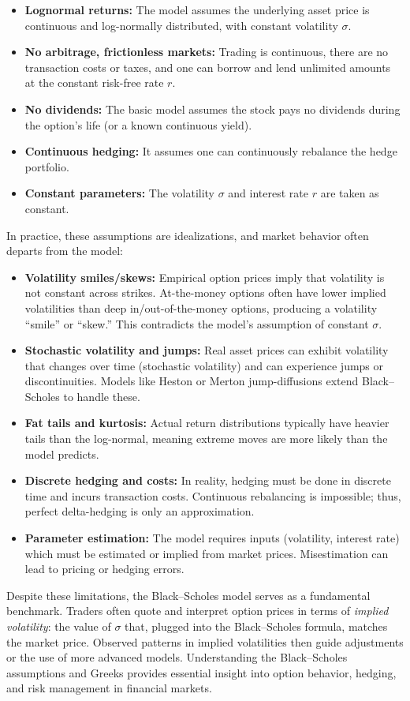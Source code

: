 \begin{itemize}
    \item \textbf{Lognormal returns:}  The model assumes the underlying asset price is continuous and log-normally distributed, with constant volatility \(\sigma\). 
    \item \textbf{No arbitrage, frictionless markets:}  Trading is continuous, there are no transaction costs or taxes, and one can borrow and lend unlimited amounts at the constant risk-free rate \(r\).
    \item \textbf{No dividends:}  The basic model assumes the stock pays no dividends during the option's life (or a known continuous yield).
    \item \textbf{Continuous hedging:}  It assumes one can continuously rebalance the hedge portfolio. 
    \item \textbf{Constant parameters:}  The volatility \(\sigma\) and interest rate \(r\) are taken as constant.
\end{itemize}

In practice, these assumptions are idealizations, and market behavior often departs from the model:

\begin{itemize}
    \item \textbf{Volatility smiles/skews:} Empirical option prices imply that volatility is not constant across strikes. At-the-money options often have lower implied volatilities than deep in/out-of-the-money options, producing a volatility ``smile'' or ``skew.'' This contradicts the model's assumption of constant \(\sigma\).
    \item \textbf{Stochastic volatility and jumps:}  Real asset prices can exhibit volatility that changes over time (stochastic volatility) and can experience jumps or discontinuities. Models like Heston or Merton jump-diffusions extend Black--Scholes to handle these.
    \item \textbf{Fat tails and kurtosis:}  Actual return distributions typically have heavier tails than the log-normal, meaning extreme moves are more likely than the model predicts.
    \item \textbf{Discrete hedging and costs:}  In reality, hedging must be done in discrete time and incurs transaction costs. Continuous rebalancing is impossible; thus, perfect delta-hedging is only an approximation.  
    \item \textbf{Parameter estimation:}  The model requires inputs (volatility, interest rate) which must be estimated or implied from market prices. Misestimation can lead to pricing or hedging errors.
\end{itemize}

Despite these limitations, the Black--Scholes model serves as a fundamental benchmark. Traders often quote and interpret option prices in terms of \emph{implied volatility}: the value of \(\sigma\) that, plugged into the Black--Scholes formula, matches the market price. Observed patterns in implied volatilities then guide adjustments or the use of more advanced models.  Understanding the Black--Scholes assumptions and Greeks provides essential insight into option behavior, hedging, and risk management in financial markets.
